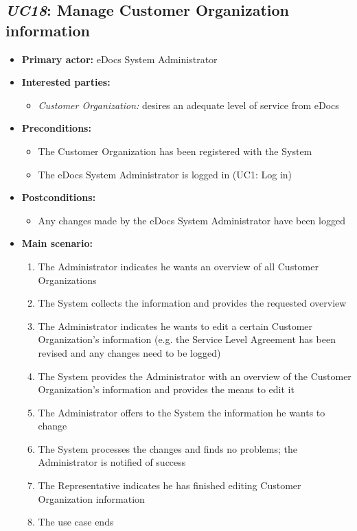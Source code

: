 \documentclass[a4paper,10pt]{article}
\begin{document}
\subsection{\emph{UC18}: Manage Customer Organization information}
\begin{itemize}
	\item \textbf{Primary actor:} eDocs System Administrator
	\item \textbf{Interested parties:} 
	\begin{itemize}
		\item \textit{Customer Organization:} desires an adequate level of service from eDocs
	\end{itemize}
	
	\item \textbf{Preconditions:}
	\begin{itemize}
		\item The Customer Organization has been registered with the System
		\item The eDocs System Administrator is logged in (UC1: Log in)
	\end{itemize}
	
	\item \textbf{Postconditions:}
	\begin{itemize}
		\item Any changes made by the eDocs System Administrator have been logged
	\end{itemize}
	
	\item \textbf{Main scenario:} 
	\begin{enumerate}
		\item The Administrator indicates he wants an overview of all Customer Organizations
		\item The System collects the information and provides the requested overview
		\item The Administrator indicates he wants to edit a certain Customer Organization's information (e.g. the Service Level Agreement has been revised and any changes need to be logged)
		\item The System provides the Administrator with an overview of the Customer Organization's information and provides the means to edit it
		\item The Administrator offers to the System the information he wants to change
		\item The System processes the changes and finds no problems; the Administrator is notified of success
		\item The Representative indicates he has finished editing Customer Organization information
		\item The use case ends
	\end{enumerate}
	

\end{itemize}
\end{document}
